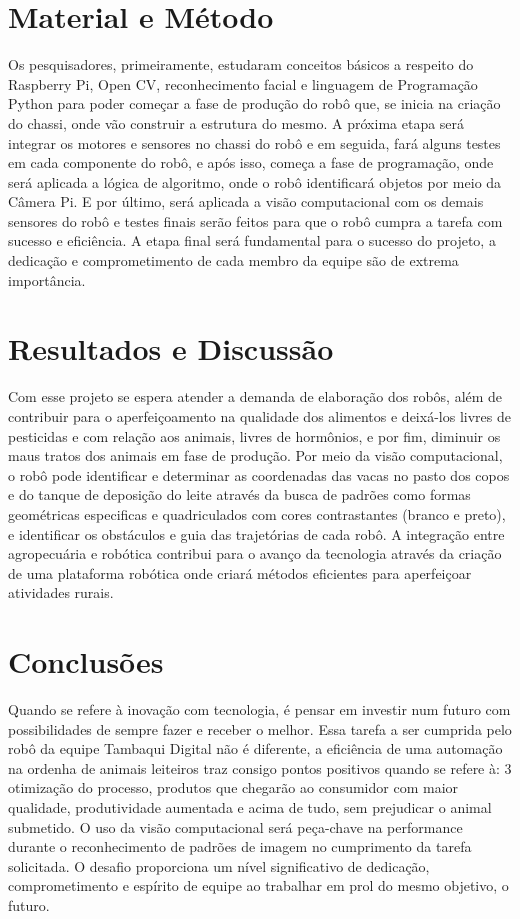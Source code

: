 \documentclass[article,12pt,onesidea,4paper,english,brazil]{abntex2}
\begin{document}
	\section*{Material e Método}
	
	Os pesquisadores, primeiramente, estudaram conceitos básicos a respeito do Raspberry Pi, Open CV, reconhecimento facial e linguagem de Programação Python para poder começar a fase de produção do robô que, se inicia na criação do chassi, onde vão construir a estrutura do mesmo. A próxima etapa será integrar os motores e sensores no chassi do robô e em seguida, fará alguns testes em cada componente do robô, e após isso, começa a fase de programação, onde será aplicada a lógica de algoritmo, onde o robô identificará objetos por meio da Câmera Pi. E por último, será aplicada a visão computacional com os demais sensores do robô e testes finais serão feitos para que o robô cumpra a tarefa com sucesso e eficiência. A etapa final será fundamental para o sucesso do projeto, a dedicação e comprometimento de cada membro da equipe são de extrema importância.
	
	\section*{Resultados e Discussão}
	
	Com esse projeto se espera atender a demanda de elaboração dos robôs, além de contribuir para o aperfeiçoamento na qualidade dos alimentos e deixá-los livres de pesticidas e com relação aos animais, livres de hormônios, e por fim, diminuir os maus tratos dos animais em fase de produção. Por meio da visão computacional, o robô pode identificar e determinar as coordenadas das vacas no pasto dos copos e do tanque de deposição do leite através da busca de padrões como formas geométricas especificas e quadriculados com cores contrastantes (branco e preto), e identificar os obstáculos e guia das trajetórias de cada robô. A integração entre agropecuária e robótica contribui para o avanço da tecnologia através da criação de uma plataforma robótica onde criará métodos eficientes para aperfeiçoar atividades rurais.
	
	\section*{Conclusões}
	
Quando se refere à inovação com tecnologia, é pensar em investir num futuro com possibilidades de sempre fazer e receber o melhor. Essa tarefa a ser cumprida pelo robô da equipe Tambaqui Digital não é diferente, a eficiência de uma automação na ordenha de animais leiteiros traz consigo pontos positivos quando se refere à:
3
otimização do processo, produtos que chegarão ao consumidor com maior qualidade, produtividade aumentada e acima de tudo, sem prejudicar o animal submetido. O uso da visão computacional será peça-chave na performance durante o reconhecimento de padrões de imagem no cumprimento da tarefa solicitada. O desafio proporciona um nível significativo de dedicação, comprometimento e espírito de equipe ao trabalhar em prol do mesmo objetivo, o futuro.
\end{document}
